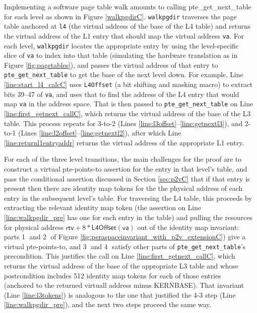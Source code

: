 Implementing a software page table walk amounts to calling \textsf{pte\_get\_next\_table} for each level as shown in Figure \ref{walkpgdirC}. 
\lstinline|walkpgdir| traverses the page table anchored at \lstinline|l4| (the virtual address of the base of the L4 table)
and returns the virtual address of the L1 entry that should map the virtual address \lstinline|va|.
For each level, \lstinline|walkpgdir| locates the appropriate entry by using the level-specific slice of \lstinline|va| to index into
that table (simulating the hardware translation as in Figure \ref{fig:pagetables}), and passes the virtual address of that entry to
\lstinline|pte_get_next_table| to get the base of the next level down.
For example, Line \ref{line:start_l4_calcC} uses \lstinline|L4Offset| (a bit shifting and masking macro) to extract bits 39--47 of \lstinline|va|,
and uses that to find the address of the L4 entry that would map \lstinline|va| in the address space.
That is then passed to \lstinline|pte_get_next_table| on Line \ref{line:first_getnext_callC}, which
returns the virtual address of the base of the L3 table. This process repeats for 3-to-2 (Lines \ref{line:l3offset}--\ref{line:getnextl3}),
and 2-to-1 (Lines \ref{line:l2offset}--\ref{line:getnextl2}), after which Line \ref{line:returnl1entryaddr} returns
the virtual address of the appropriate L1 entry.

For each of the three level transitions, the main challenges for the proof are to
construct a virtual pte-points-to assertion for the entry in that level's table,
and pass the conditional assertion discussed in Section \ref{sec:p2vC} that if that entry is present then there are
identity map tokens for the the physical address of each entry in the subsequent level's table.
For traversing the L4 table, this proceeds by extracting the relevant identity map token
(the assertion on Line \ref{line:walkpgdir_pre} has one for each entry in the table)
and pulling the resources for physical address $\mathsf{rtv}+8*\textsf{L4Offset}(\textsf{va})$
out of the identity map invariant: 
parts \textcircled{1} and \textcircled{2} of Figure \ref{fig:peraspaceinvariant_with_p2v_extensionC}) give a virtual pte-points-to,
and \textcircled{3} and \textcircled{4} satisfy other parts of \lstinline|pte_get_next_table|'s precondition.
This justifies the call on Line \ref{line:first_getnext_callC},
which returns the virtual address of the base of the appropriate L3 table and whose postcondition
includes 512 identity map tokens for each of those entries (anchored to the returned virtuall address minus \textsf{KERNBASE}).
That invariant (Line \ref{line:l3tokens}) is analogous to the one that justified the 4-3 step (Line \ref{line:walkpgdir_pre}), and the next two steps proceed the same way.

